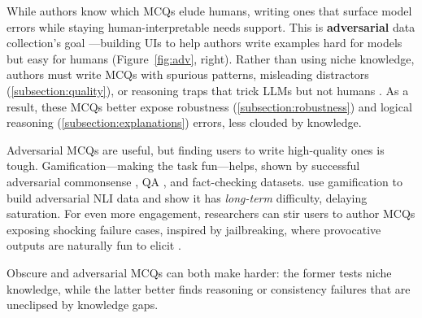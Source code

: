 While authors know which MCQs elude humans, writing ones that surface model errors while staying human-interpretable needs support.
This is \textbf{adversarial} data collection's goal \cite{kiela-etal-2021-dynabench}---building UIs to help authors write examples hard for models but easy for humans (Figure~\ref{fig:adv}, right).
Rather than using niche knowledge, authors must write MCQs with spurious patterns, misleading distractors (\cref{subsection:quality}), or reasoning traps that trick LLMs but not humans \cite{xu2023llm}.
As a result, these MCQs better expose robustness (\cref{subsection:robustness}) and logical reasoning (\cref{subsection:explanations}) errors, less clouded by knowledge.

Adversarial MCQs are useful, but finding users to write high-quality ones is tough.
Gamification---making the task fun---helps, shown by successful adversarial commonsense \cite{talmor2022commonsenseqa}, QA \cite{wallace2019trick}, and fact-checking \cite{eisenschlos2021fool} datasets.
\citet{wallace-etal-2022-analyzing} use gamification to build adversarial NLI data and show it has \textit{long-term} difficulty, delaying saturation. 
For even more engagement, researchers can stir users to author MCQs exposing shocking failure cases, inspired by jailbreaking, where provocative outputs are naturally fun to elicit \cite{10.1145/3656156.3665432}.


Obscure and adversarial MCQs can both make \mcqa harder: the former
tests niche knowledge, while the latter better finds reasoning or
consistency failures that are uneclipsed by knowledge gaps.
